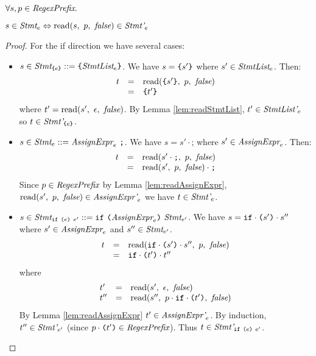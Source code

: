 \documentclass[onecolumn]{sigplanconf-onecolumn}
\begin{document}
\begin{lemma}\mbox{}
  
  \( \forall s, p \in \textit{RegexPrefix}. \)

  \( s \in \textit{Stmt}_{e} \Leftrightarrow 
  \textrm{read}(s,~p,~\textit{false}) \in \textit{Stmt'}_{e} \)
\end{lemma}
\begin{proof}
  For the if direction we have several cases:
  \begin{itemize}

  \item \( s \in \textit{Stmt}_{\texttt{\{}e\texttt{\}}} ::=
    \texttt{\{}\textit{StmtList}_{e}\texttt{\}} \). We have \( s = \texttt{\{}s'\texttt{\}} \)
    where \( s' \in \textit{StmtList}_{e} \). Then:
    \[
    \begin{array}{rcl}
      t &=& \textrm{read}(\texttt{\{}s'\texttt{\}},~p,~\textit{false})
      \\
      &=& \texttt{\{}t'\texttt{\}}
    \end{array}
    \]
    where \( t' = \textrm{read}(s',~\epsilon,~\textit{false}) \). By Lemma
    \ref{lem:readStmtList}, \( t' \in \textit{StmtList'}_{e} \)
    so \( t \in \textit{Stmt'}_{\texttt{\{}e\texttt{\}}} \).


  \item \( s \in \textit{Stmt}_{e} ::= \textit{AssignExpr}_{e}~\texttt{;}
    \). We have \( s = s' \cdot \texttt{;} \) where \( s' \in
    \textit{AssignExpr}_{e} \). Then:
    \[
    \begin{array}{rcl}
      t &=& \textrm{read}(s'\cdot \texttt{;},~p,~\textit{false})
      \\
      &=& \textrm{read}(s',~p,~\textit{false}) \cdot \texttt{;}
    \end{array}
    \]
    Since \( p \in \textit{RegexPrefix} \) by Lemma
    \ref{lem:readAssignExpr}, \( \textrm{read}(s',~p,~\textit{false}) \in
    \textit{AssignExpr'}_{e} \) we have \( t \in
    \textit{Stmt'}_{e} \).

  \item \( s \in \textit{Stmt}_{\texttt{if}~\texttt{(}e\texttt{)}~e'} ::=
    \texttt{if}~ \texttt{(}\textit{AssignExpr}_{e}\texttt{)}~ \textit{Stmt}_{e'} \).
    We have \( s = \texttt{if}\cdot \texttt{(}s'\texttt{)}\cdot s'' \) where \(
    s' \in \textit{AssignExpr}_{e} \) and \( s'' \in \textit{Stmt}_{e'}
    \).
    \[
    \begin{array}{rcl}
      t &=& \textrm{read}(
        \texttt{if}\cdot \texttt{(}s'\texttt{)}\cdot s'' 
      ,~p,~\textit{false})
      \\
      &=& \texttt{if} \cdot \texttt{(}t'\texttt{)} \cdot t'' 
    \end{array}
    \]
    where 
    \[ 
    \begin{array}{lcl}
      t' &=& \textrm{read}(s',~\epsilon,~\textit{false})
      \\
      t'' &=& \textrm{read}(s'',~
        p \cdot \texttt{if} \cdot \texttt{(}t'\texttt{)}
      ,~\textit{false})
    \end{array}
    \]
    By Lemma \ref{lem:readAssignExpr} \( t' \in
    \textit{AssignExpr'}_{e} \). By induction, 
    \( t'' \in \textit{Stmt'}_{e'} \) (since
    \( p \cdot \texttt{(}t'\texttt{)} \in \textit{RegexPrefix} \)). Thus \( t \in
    \textit{Stmt'}_{\texttt{if}~\texttt{(}e\texttt{)}~e'} \).


\end{itemize}
\end{proof}
\end{document}
